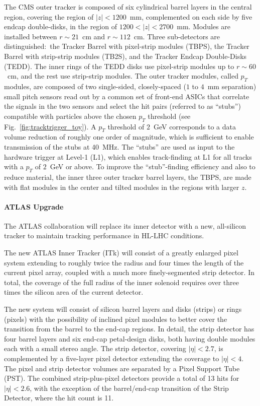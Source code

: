The CMS outer tracker is composed of six cylindrical barrel layers in the central region, covering the region of $|z| < 1200$~mm, complemented on each side by five endcap double-disks, in the region of $1200 < |z| < 2700$~mm. Modules are installed between $r\sim21$~cm and $r\sim112$~cm. Three sub-detectors are distinguished:~the Tracker Barrel with pixel-strip modules (TBPS), the Tracker Barrel with strip-strip modules (TB2S), and the Tracker Endcap Double-Disks (TEDD). The inner rings of the TEDD disks use pixel-strip modules up to $r\sim 60$~cm, and the rest use strip-strip modules. The outer tracker modules, called $p_T$ modules, are composed of two single-sided, closely-spaced ($1$ to $4$~mm separation) small pitch sensors read out by a common set of front-end ASICs that correlate the signals in the two sensors and select the hit pairs (referred to as ``stubs'') compatible with particles above the chosen $p_T$ threshold (see Fig.~\ref{fig:tracktrigger_toy}). A $p_T$ threshold of $2$~GeV corresponds to a data volume reduction of roughly one order of magnitude, which is sufficient to enable transmission of the stubs at 40~MHz.
The ``stubs'' are used as input to the hardware trigger at Level-1 (L1), which enables track-finding at L1 for all tracks with a $p_T$ of $2$~GeV or above. To improve the ``stub''-finding efficiency and also to reduce material, the inner three outer tracker barrel layers, the TBPS, are made with flat modules in the center and tilted modules in the regions with larger $z$.

\paragraph{ATLAS Upgrade}
The ATLAS collaboration will replace its inner detector with a new, all-silicon tracker to maintain tracking performance in HL-LHC conditions.

The new ATLAS Inner Tracker (ITk) will consist of a greatly enlarged pixel system extending to roughly twice the radius and four times the length of the current pixel array, coupled with a much more finely-segmented strip detector. In total, the coverage of the full radius of the inner solenoid requires over three times the silicon area of the current detector.

The new system will consist of silicon barrel layers and disks (strips) or rings (pixels) with the possibility of inclined pixel modules to better cover the transition from the barrel to the end-cap regions. In detail, the strip detector has four barrel layers and six end-cap petal-design disks, both having double modules each with a small stereo angle. The strip detector, covering $|\eta|< 2.7$, is complemented by a five-layer pixel detector extending the coverage to $|\eta |< 4$. The pixel and strip detector volumes are separated by a Pixel Support Tube (PST). The combined strip-plus-pixel detectors provide a total of 13 hits for $|\eta| < 2.6$, with the exception of the barrel/end-cap transition of the Strip Detector, where the hit count is 11.

